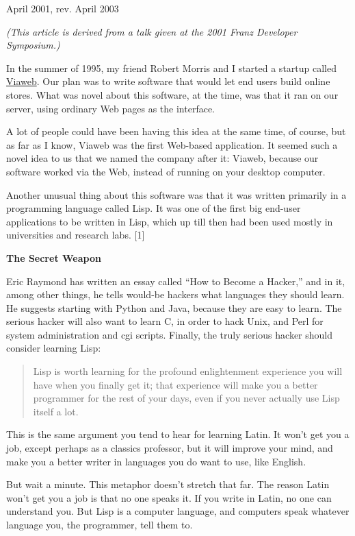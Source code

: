 April 2001, rev. April 2003

\emph{(This article is derived from a talk given at the 2001 Franz
Developer Symposium.)}

In the summer of 1995, my friend Robert Morris and I started a startup
called \href{http://docs.yahoo.com/docs/pr/release184.html}{Viaweb}. Our
plan was to write software that would let end users build online stores.
What was novel about this software, at the time, was that it ran on our
server, using ordinary Web pages as the interface.

A lot of people could have been having this idea at the same time, of
course, but as far as I know, Viaweb was the first Web-based
application. It seemed such a novel idea to us that we named the company
after it: Viaweb, because our software worked via the Web, instead of
running on your desktop computer.

Another unusual thing about this software was that it was written
primarily in a programming language called Lisp. It was one of the first
big end-user applications to be written in Lisp, which up till then had
been used mostly in universities and research labs. {[}1{]}

\textbf{The Secret Weapon}

Eric Raymond has written an essay called ``How to Become a Hacker,'' and
in it, among other things, he tells would-be hackers what languages they
should learn. He suggests starting with Python and Java, because they
are easy to learn. The serious hacker will also want to learn C, in
order to hack Unix, and Perl for system administration and cgi scripts.
Finally, the truly serious hacker should consider learning Lisp:

\begin{quote}
Lisp is worth learning for the profound enlightenment experience you
will have when you finally get it; that experience will make you a
better programmer for the rest of your days, even if you never actually
use Lisp itself a lot.
\end{quote}

This is the same argument you tend to hear for learning Latin. It won't
get you a job, except perhaps as a classics professor, but it will
improve your mind, and make you a better writer in languages you do want
to use, like English.

But wait a minute. This metaphor doesn't stretch that far. The reason
Latin won't get you a job is that no one speaks it. If you write in
Latin, no one can understand you. But Lisp is a computer language, and
computers speak whatever language you, the programmer, tell them to.

